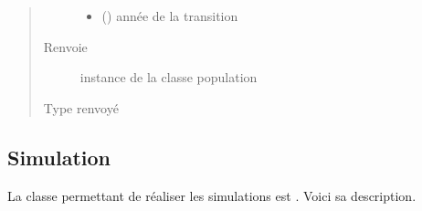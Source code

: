 \documentclass[letterpaper,10pt,french]{sphinxmanual}
\begin{document}
\begin{fulllineitems}
\begin{fulllineitems}
\begin{quote}
\begin{description}
\begin{itemize}
\item {} 
 () \textendash{} année de la transition

\end{itemize}

\item[{Renvoie}] \leavevmode
instance de la classe population

\item[{Type renvoyé}] \leavevmode
{\hyperref[\detokenize{code:simgen.population}]{}}

\end{description}\end{quote}

\end{fulllineitems}


\end{fulllineitems}



\subsection{Simulation}
\label{\detokenize{code:simulation}}
La classe permettant de réaliser les simulations est . Voici sa description.
\end{document}
